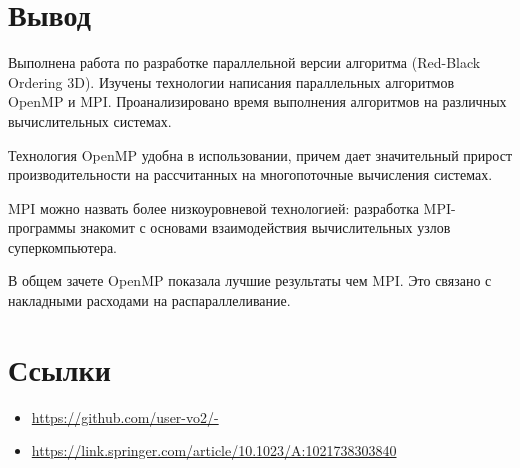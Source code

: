 \documentclass[a4paper,12pt,titlepage,final]{article}
\begin{document}
\section{Вывод}
Выполнена работа по разработке параллельной версии алгоритма (Red-Black Ordering 3D). Изучены
технологии написания параллельных алгоритмов OpenMP и MPI. Проанализировано время выполнения
алгоритмов на различных вычислительных системах.\par
Технология OpenMP удобна в использовании, причем дает значительный прирост производительности на
рассчитанных на многопоточные вычисления системах.\par
MPI можно назвать более низкоуровневой технологией: разработка MPI-программы знакомит с основами
взаимодействия вычислительных узлов суперкомпьютера.\par
В общем зачете OpenMP показала лучшие результаты чем MPI. Это связано с накладными расходами на распараллеливание.
\section{Ссылки}
\begin{raggedright}
\begin{itemize}
\item \url{https://github.com/user-vo2/-}
\item \url{https://link.springer.com/article/10.1023/A:1021738303840}
\end{itemize}
\end{raggedright}
\end{document}

